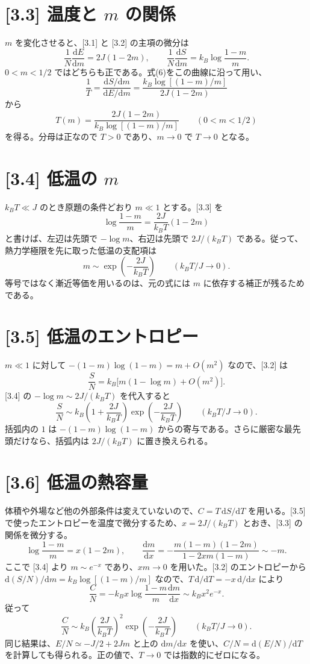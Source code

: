 \documentclass[11pt,a4paper]{article}
\begin{document}
\section*{[3.3] 温度と $m$ の関係}
$m$ を変化させると、[3.1] と [3.2] の主項の微分は
\[
\frac{1}{N}\frac{\mathrm dE}{\mathrm dm}=2J(1-2m),\qquad
\frac{1}{N}\frac{\mathrm dS}{\mathrm dm}=k_B\log\frac{1-m}{m}.
\]
$0<m<1/2$ ではどちらも正である。式(6)をこの曲線に沿って用い、
\[
\frac1T=\frac{\mathrm dS/\mathrm dm}{\mathrm dE/\mathrm dm}
=\frac{k_B\log[(1-m)/m]}{2J(1-2m)}
\]
から
\[
\boxed{T(m)=\frac{2J(1-2m)}{k_B\log[(1-m)/m]}}\qquad(0<m<1/2)
\]
を得る。分母は正なので $T>0$ であり、$m\to0$ で $T\to0$ となる。

\section*{[3.4] 低温の $m$}
$k_BT\ll J$ のとき原題の条件どおり $m\ll1$ とする。[3.3] を
\[
\log\frac{1-m}{m}=\frac{2J}{k_BT}(1-2m)
\]
と書けば、左辺は先頭で $-\log m$、右辺は先頭で $2J/(k_BT)$ である。従って、熱力学極限を先に取った低温の支配項は
\[
\boxed{m\sim\exp\!\left(-\frac{2J}{k_BT}\right)}\qquad(k_BT/J\to0).
\]
等号ではなく漸近等価を用いるのは、元の式には $m$ に依存する補正が残るためである。

\section*{[3.5] 低温のエントロピー}
$m\ll1$ に対して $-(1-m)\log(1-m)=m+O(m^2)$ なので、[3.2] は
\[
\frac{S}{N}=k_B\bigl[m(1-\log m)+O(m^2)\bigr].
\]
[3.4] の $-\log m\sim2J/(k_BT)$ を代入すると
\[
\boxed{\frac{S}{N}\sim k_B\left(1+\frac{2J}{k_BT}\right)
\exp\!\left(-\frac{2J}{k_BT}\right)}\qquad(k_BT/J\to0).
\]
括弧内の $1$ は $-(1-m)\log(1-m)$ からの寄与である。さらに厳密な最先頭だけなら、括弧内は $2J/(k_BT)$ に置き換えられる。

\section*{[3.6] 低温の熱容量}
体積や外場など他の外部条件は変えていないので、$C=T\,\mathrm dS/\mathrm dT$ を用いる。[3.5] で使ったエントロピーを温度で微分するため、$x=2J/(k_BT)$ とおき、[3.3] の関係を微分する。
\[
\log\frac{1-m}{m}=x(1-2m),\qquad
\frac{\mathrm dm}{\mathrm dx}
=-\frac{m(1-m)(1-2m)}{1-2xm(1-m)}\sim-m.
\]
ここで [3.4] より $m\sim e^{-x}$ であり、$xm\to0$ を用いた。[3.2] のエントロピーから $\mathrm d(S/N)/\mathrm dm=k_B\log[(1-m)/m]$ なので、$T\,\mathrm d/\mathrm dT=-x\,\mathrm d/\mathrm dx$ により
\[
\frac{C}{N}=-k_Bx\log\frac{1-m}{m}\frac{\mathrm dm}{\mathrm dx}
\sim k_Bx^2e^{-x}.
\]
従って
\[
\boxed{\frac{C}{N}\sim k_B\left(\frac{2J}{k_BT}\right)^2
\exp\!\left(-\frac{2J}{k_BT}\right)}\qquad(k_BT/J\to0).
\]
同じ結果は、$E/N\simeq-J/2+2Jm$ と上の $\mathrm dm/\mathrm dx$ を使い、$C/N=\mathrm d(E/N)/\mathrm dT$ を計算しても得られる。正の値で、$T\to0$ では指数的にゼロになる。
\end{document}
